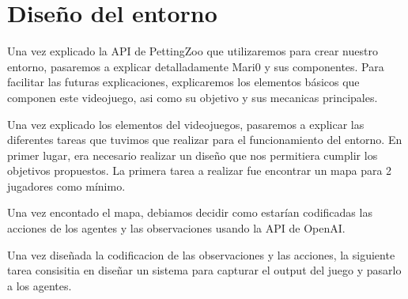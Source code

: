 \section{Diseño del entorno}





Una vez explicado la API de PettingZoo que utilizaremos para crear nuestro entorno, pasaremos a explicar detalladamente Mari0 y sus componentes. Para facilitar las futuras explicaciones, explicaremos los elementos básicos que componen este videojuego, asi como su objetivo y sus mecanicas principales.



Una vez explicado los elementos del videojuegos, pasaremos a explicar las diferentes tareas que tuvimos que realizar para el funcionamiento del entorno. En primer lugar, era necesario realizar un diseño que nos permitiera cumplir los objetivos propuestos. La primera tarea a realizar fue encontrar un mapa para 2 jugadores como mínimo.



Una vez encontado el mapa, debiamos decidir como estarían codificadas las acciones de los agentes y las observaciones usando la API de OpenAI.





Una vez diseñada la codificacion de las observaciones y las acciones, la siguiente tarea consisitia en diseñar un sistema para capturar el output del juego y pasarlo a los agentes.



